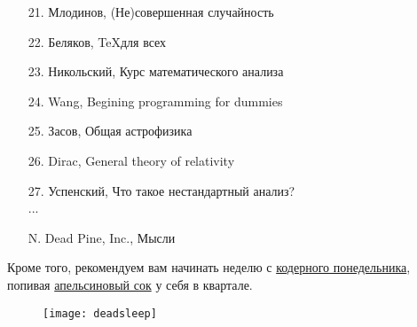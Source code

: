 \begin{itemize}
        \item[21.] Млодинов, (Не)совершенная случайность
        \item[22.] Беляков, \TeX для всех
        \item[23.] Никольский, Курс математического анализа
        \item[24.] Wang, Begining programming for dummies
        \item[25.] Засов, Общая астрофизика
        \item[26.] Dirac, General theory of relativity
        \item[27.] Успенский, Что такое нестандартный анализ?\\
        ...
        \item[N.] Dead Pine, Inc., Мысли
     
\end{itemize}

Кроме того, рекомендуем вам начинать неделю с 
\href{https://freecx.github.io/}{кодерного понедельника},
попивая \href{https://citrux.github.io/blog/}{апельсиновый сок} у себя в квартале.

\begin{figure}[ht!]
    \centering
    \texttt{[image: deadsleep]}
\end{figure}
